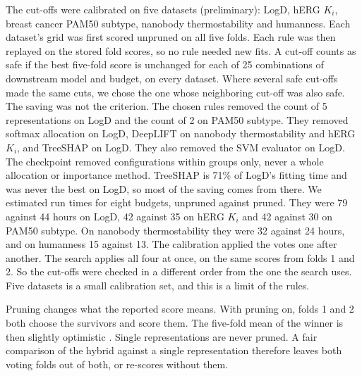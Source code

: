 The cut-offs were calibrated on five datasets (preliminary): LogD, hERG $K_i$, breast cancer PAM50 subtype, nanobody thermostability and humanness. Each dataset's grid was first scored unpruned on all five folds. Each rule was then replayed on the stored fold scores, so no rule needed new fits. A cut-off counts as safe if the best five-fold score is unchanged for each of 25 combinations of downstream model and budget, on every dataset. Where several safe cut-offs made the same cuts, we chose the one whose neighboring cut-off was also safe. The saving was not the criterion. The chosen rules removed the count of 5 representations on LogD and the count of 2 on PAM50 subtype. They removed softmax allocation on LogD, DeepLIFT on nanobody thermostability and hERG $K_i$, and TreeSHAP on LogD. They also removed the SVM evaluator on LogD. The checkpoint removed configurations within groups only, never a whole allocation or importance method. TreeSHAP is 71\% of LogD's fitting time and was never the best on LogD, so most of the saving comes from there. We estimated run times for eight budgets, unpruned against pruned. They were 79 against 44 hours on LogD, 42 against 35 on hERG $K_i$ and 42 against 30 on PAM50 subtype. On nanobody thermostability they were 32 against 24 hours, and on humanness 15 against 13. The calibration applied the votes one after another. The search applies all four at once, on the same scores from folds 1 and 2. So the cut-offs were checked in a different order from the one the search uses. Five datasets is a small calibration set, and this is a limit of the rules.

Pruning changes what the reported score means. With pruning on, folds 1 and 2 both choose the survivors and score them. The five-fold mean of the winner is then slightly optimistic \citep{Cawley2010}. Single representations are never pruned. A fair comparison of the hybrid against a single representation therefore leaves both voting folds out of both, or re-scores without them.

